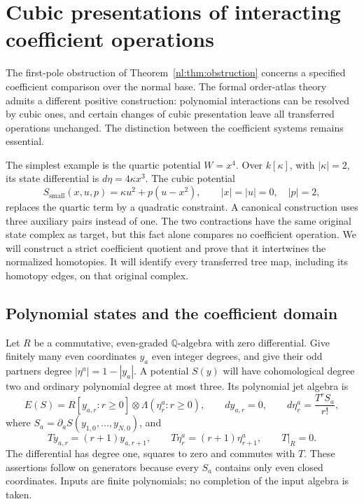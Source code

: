 \section{Cubic presentations of interacting coefficient operations}
\label{cp:sec}

The first-pole obstruction of Theorem~\ref{nl:thm:obstruction}
concerns a specified coefficient comparison over the normal base.
The formal order-atlas theory admits a different positive construction:
polynomial interactions can be resolved by cubic ones, and certain
changes of cubic presentation leave all transferred operations
unchanged.  The distinction between the coefficient systems remains
essential.

The simplest example is the quartic potential \(W=x^4\).  Over
\(k[\kappa]\), with \(|\kappa|=2\), its state differential is
\(d\eta=4\kappa x^3\).  The cubic potential
\[
 S_{\mathrm{small}}(x,u,p)=\kappa u^2+p(u-x^2),
 \qquad |x|=|u|=0,\quad |p|=2,
\]
replaces the quartic term by a quadratic constraint.  A canonical
construction uses three auxiliary pairs instead of one.  The two
contractions have the same original state complex as target, but
this fact alone compares no coefficient operation.  We will construct
a strict coefficient quotient and prove that it intertwines the
normalized homotopies.  It will identify every transferred tree map,
including its homotopy edges, on that original complex.

\subsection{Polynomial states and the coefficient domain}

Let \(R\) be a commutative, even-graded \(\mathbb Q\)-algebra with
zero differential.  Give finitely many even coordinates \(y_a\)
even integer degrees, and give their odd partners degree
\(|\eta^a|=1-|y_a|\).  A potential \(S(y)\) will have
cohomological degree two and ordinary polynomial degree at most three.
Its polynomial jet algebra is
\begin{equation}\label{cp:eq:states}
 E(S)=R[y_{a,r}:r\geq0]\otimes
                  \Lambda(\eta^a_r:r\geq0),
 \qquad
 dy_{a,r}=0,\qquad
 d\eta^a_r=\frac{T^r S_a}{r!},
\end{equation}
where \(S_a=\partial_aS(y_{1,0},\ldots,y_{N,0})\), and
\[
 Ty_{a,r}=(r+1)y_{a,r+1},\qquad
 T\eta^a_r=(r+1)\eta^a_{r+1},\qquad T|_R=0.
\]
The differential has degree one, squares to zero and commutes with
\(T\).  These assertions follow on generators because every \(S_a\)
contains only even closed coordinates.  Inputs are finite polynomials;
no completion of the input algebra is taken.

